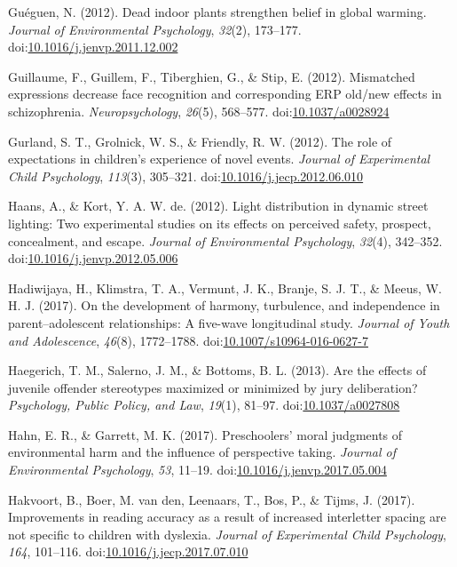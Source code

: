 \documentclass[english,man]{apa6}
\begin{document}
\hypertarget{ref-Gueguen2012}{}
Guéguen, N. (2012). Dead indoor plants strengthen belief in global
warming. \emph{Journal of Environmental Psychology}, \emph{32}(2),
173--177.
doi:\href{https://doi.org/10.1016/j.jenvp.2011.12.002}{10.1016/j.jenvp.2011.12.002}

\hypertarget{ref-Guillaume2012}{}
Guillaume, F., Guillem, F., Tiberghien, G., \& Stip, E. (2012).
Mismatched expressions decrease face recognition and corresponding ERP
old/new effects in schizophrenia. \emph{Neuropsychology}, \emph{26}(5),
568--577. doi:\href{https://doi.org/10.1037/a0028924}{10.1037/a0028924}

\hypertarget{ref-Gurland2012}{}
Gurland, S. T., Grolnick, W. S., \& Friendly, R. W. (2012). The role of
expectations in children's experience of novel events. \emph{Journal of
Experimental Child Psychology}, \emph{113}(3), 305--321.
doi:\href{https://doi.org/10.1016/j.jecp.2012.06.010}{10.1016/j.jecp.2012.06.010}

\hypertarget{ref-Haans2012}{}
Haans, A., \& Kort, Y. A. W. de. (2012). Light distribution in dynamic
street lighting: Two experimental studies on its effects on perceived
safety, prospect, concealment, and escape. \emph{Journal of
Environmental Psychology}, \emph{32}(4), 342--352.
doi:\href{https://doi.org/10.1016/j.jenvp.2012.05.006}{10.1016/j.jenvp.2012.05.006}

\hypertarget{ref-Hadiwijaya2017}{}
Hadiwijaya, H., Klimstra, T. A., Vermunt, J. K., Branje, S. J. T., \&
Meeus, W. H. J. (2017). On the development of harmony, turbulence, and
independence in parent--adolescent relationships: A five-wave
longitudinal study. \emph{Journal of Youth and Adolescence},
\emph{46}(8), 1772--1788.
doi:\href{https://doi.org/10.1007/s10964-016-0627-7}{10.1007/s10964-016-0627-7}

\hypertarget{ref-Haegerich2013}{}
Haegerich, T. M., Salerno, J. M., \& Bottoms, B. L. (2013). Are the
effects of juvenile offender stereotypes maximized or minimized by jury
deliberation? \emph{Psychology, Public Policy, and Law}, \emph{19}(1),
81--97. doi:\href{https://doi.org/10.1037/a0027808}{10.1037/a0027808}

\hypertarget{ref-Hahn2017}{}
Hahn, E. R., \& Garrett, M. K. (2017). Preschoolers' moral judgments of
environmental harm and the influence of perspective taking.
\emph{Journal of Environmental Psychology}, \emph{53}, 11--19.
doi:\href{https://doi.org/10.1016/j.jenvp.2017.05.004}{10.1016/j.jenvp.2017.05.004}

\hypertarget{ref-Hakvoort2017}{}
Hakvoort, B., Boer, M. van den, Leenaars, T., Bos, P., \& Tijms, J.
(2017). Improvements in reading accuracy as a result of increased
interletter spacing are not specific to children with dyslexia.
\emph{Journal of Experimental Child Psychology}, \emph{164}, 101--116.
doi:\href{https://doi.org/10.1016/j.jecp.2017.07.010}{10.1016/j.jecp.2017.07.010}
\end{document}
